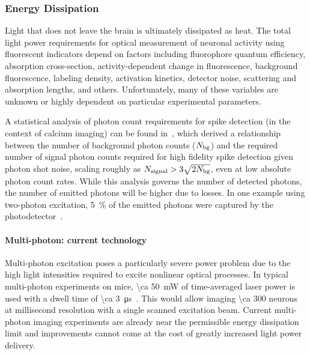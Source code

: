 \subsubsection{Energy Dissipation}

Light that does not leave the brain is ultimately dissipated as heat.
The total light power requirements for optical measurement of neuronal activity using fluorescent indicators depend on factors including
fluorophore quantum efficiency,
absorption cross-section,
activity-dependent change in fluorescence,
background fluorescence,
labeling density,
activation kinetics,
detector noise,
scattering and absorption lengths,
and others. Unfortunately, many of these variables are unknown or highly dependent on particular experimental parameters.

A statistical analysis of photon count requirements for spike detection (in the context of calcium imaging) can be found in~\cite{wilt13}, which derived a relationship between the number of background photon counts ($N_{\text{\scriptsize bg}}$) and the required number of signal photon counts required for high fidelity spike detection given photon shot noise, scaling roughly as $N_{\text{\scriptsize signal}} > 3\sqrt{2N_{\text{\scriptsize bg}}}$, even at low absolute photon count rates.
While this analysis governs the number of detected photons, the number of emitted photons will be higher due to losses.
In one example using two-photon excitation, \SI{5}{\percent} of the emitted photons were captured by the photodetector~\cite{kim99}.

\paragraph{Multi-photon: current technology}
Multi-photon excitation poses a particularly severe power problem due to the high light intensities required to excite nonlinear optical processes.
In typical multi-photon experiments on mice, \SI{\ca 50}{\milli\watt} of time-averaged laser power is used with a dwell time of \SI{\ca 3}{\micro\second}~\cite{wilson07}.
This would allow imaging \num{\ca 300} neurons at millisecond resolution with a single scanned excitation beam.
Current multi-photon imaging experiments are already near the permissible energy dissipation limit and improvements cannot come at the cost of greatly increased light power delivery.

